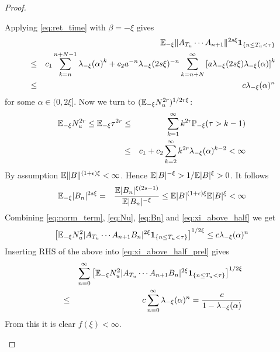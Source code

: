 \documentclass{article}
\theoremstyle{remark}
\begin{document}
\begin{proof}
\begin{enumerate}
\begin{enumerate}
      Applying \eqref{eq:ret_time} with $\beta = -\xi$ gives
      \begin{eqnarray}
        && \mathbb{E}_{-\xi} \|A_{T_u} \cdots A_{n+1}\|^{2s\xi}
        \mathbf{1}_{\{n \leq T_u < \tau\}} \nonumber \\
        &\leq& c_1 \sum_{k=n}^{n+N-1} {\lambda_{-\xi}(\alpha)}^k +
        c_2 a^{-n} \lambda_{-\xi}(2s\xi)^{-n}
        \sum_{k=n+N}^\infty \left[
          a \lambda_{-\xi}(2s\xi)
          \lambda_{-\xi}(\alpha)
        \right]^k \nonumber \\
        &\leq& c \lambda_{-\xi}(\alpha)^n \label{eq:norm_term}
      \end{eqnarray}
      for some $\alpha \in (0, 2\xi]$. Now we turn to $(\mathbb{E}_{-\xi}
      N_u^{2r})^{1/2r\xi}$:
      \begin{eqnarray}
        \mathbb{E}_{-\xi} N_u^{2r} \leq \mathbb{E}_{-\xi} \tau^{2r} &\leq&
        \sum_{k=1}^{\infty} k^{2r} \mathbb{P}_{-\xi}(\tau > k-1)
        \nonumber \\
        &\leq& c_1 + c_2 \sum_{k=2}^{\infty} k^{2r}
        \lambda_{-\xi}(\alpha)^{k-2} < \infty \label{eq:Nu}
      \end{eqnarray}
      By assumption $\mathbb{E} \|B\|^{(1 + \epsilon) \xi} < \infty$. Hence
      $\mathbb{E}|B|^{-\xi} > 1/\mathbb{E}|B|^\xi > 0$. It follows
      \begin{eqnarray}
        \mathbb{E}_{-\xi}|B_n|^{2s\xi} &=& {
          \mathbb{E} |B_n|^{\xi(2s - 1)}
          \over
          \mathbb{E} |B_n|^{-\xi}
        } \leq \mathbb{E} |B|^{(1 + \epsilon) \xi} \mathbb{E} |B|^{\xi} < \infty \label{eq:Bn}
      \end{eqnarray}
      Combining \eqref{eq:norm_term}, \eqref{eq:Nu}, \eqref{eq:Bn} and
      \eqref{eq:xi_above_half} we get
      \begin{eqnarray}
        \left[ \mathbb{E}_{-\xi} N_u^2 
          |A_{T_u} \cdots A_{n+1} B_n|^{2\xi}
          \mathbf{1}_{\{n \leq T_u < \tau\}} \right]^{1/2\xi} \leq c
        \lambda_{-\xi}(\alpha)^n \label{eq:xi_above_half_final}
      \end{eqnarray}
      Inserting RHS of the above into \eqref{eq:xi_above_half_prel}
      gives
      \begin{eqnarray*}
        && \sum_{n=0}^{\infty}
        \left[
          \mathbb{E}_{-\xi} N_u^2 
          |A_{T_u} \cdots A_{n+1} B_n|^{2\xi}
          \mathbf{1}_{\{n \leq T_u < \tau\}}
        \right]^{1/2\xi} \\
        &\leq& c \sum_{n=0}^{\infty} \lambda_{-\xi}(\alpha)^n
        = {c \over 1 - \lambda_{-\xi}(\alpha)}
      \end{eqnarray*}
      From this it is clear $f(\xi) < \infty$.

\end{enumerate}
\end{enumerate}
\end{proof}
\end{document}

